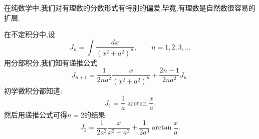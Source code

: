 
在纯数学中,我们对有理数的分数形式有特别的偏爱.毕竟,有理数是自然数很容易的扩展.


在不定积分中,设
$$J_n = \int\frac{dx}{(x^2+a^2)^n}, \qquad n = 1, 2, 3, \dots $$
用分部积分,我们知有递推公式\cite{FeiH2}
$$J_{n+1} =\frac{1}{2na^2} \frac{x}{(x^2+a^2)^n} + \frac{2n-1}{2na^2}J_n.$$
初学微积分都知道:
$$J_1=\frac{1}{a}\arctan\frac{x}{a}.$$
然后用递推公式可得$n = 2$的结果
$$J_2 = \frac{1}{2a^2}\frac{x}{x^2+a^2} + \frac{1}{2a^3}\arctan\frac{x}{a}.$$